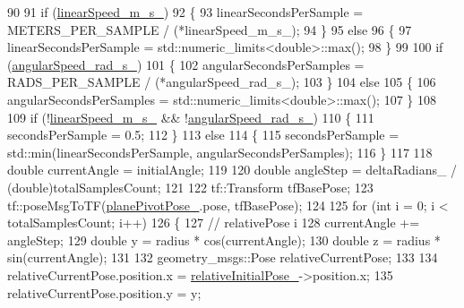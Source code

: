 \begin{DoxyCode}
90 
91             \textcolor{keywordflow}{if} (\hyperlink{classcl__move__group__interface_1_1CbCircularPivotMotion_adf6f6bc7a7a55f5c3dff80475e33c2e3}{linearSpeed\_m\_s\_})
92             \{
93                 linearSecondsPerSample = METERS\_PER\_SAMPLE / (*linearSpeed\_m\_s\_);
94             \}
95             \textcolor{keywordflow}{else}
96             \{
97                 linearSecondsPerSample = std::numeric\_limits<double>::max();
98             \}
99 
100             \textcolor{keywordflow}{if} (\hyperlink{classcl__move__group__interface_1_1CbCircularPivotMotion_a39fa383804d82285e07fa1c5a37cc587}{angularSpeed\_rad\_s\_})
101             \{
102                 angularSecondsPerSamples = RADS\_PER\_SAMPLE / (*angularSpeed\_rad\_s\_);
103             \}
104             \textcolor{keywordflow}{else}
105             \{
106                 angularSecondsPerSamples = std::numeric\_limits<double>::max();
107             \}
108 
109             \textcolor{keywordflow}{if} (!\hyperlink{classcl__move__group__interface_1_1CbCircularPivotMotion_adf6f6bc7a7a55f5c3dff80475e33c2e3}{linearSpeed\_m\_s\_} && !\hyperlink{classcl__move__group__interface_1_1CbCircularPivotMotion_a39fa383804d82285e07fa1c5a37cc587}{angularSpeed\_rad\_s\_})
110             \{
111                 secondsPerSample = 0.5;
112             \}
113             \textcolor{keywordflow}{else}
114             \{
115                 secondsPerSample = std::min(linearSecondsPerSample, angularSecondsPerSamples);
116             \}
117 
118             \textcolor{keywordtype}{double} currentAngle = initialAngle;
119 
120             \textcolor{keywordtype}{double} angleStep = deltaRadians\_ / (double)totalSamplesCount;
121 
122             tf::Transform tfBasePose;
123             tf::poseMsgToTF(\hyperlink{classcl__move__group__interface_1_1CbCircularPivotMotion_a0994efbe93b9f9a61fcf3703c360cda2}{planePivotPose\_}.pose, tfBasePose);
124 
125             \textcolor{keywordflow}{for} (\textcolor{keywordtype}{int} i = 0; i < totalSamplesCount; i++)
126             \{
127                 \textcolor{comment}{// relativePose i}
128                 currentAngle += angleStep;
129                 \textcolor{keywordtype}{double} y = radius * cos(currentAngle);
130                 \textcolor{keywordtype}{double} z = radius * sin(currentAngle);
131 
132                 geometry\_msgs::Pose relativeCurrentPose;
133 
134                 relativeCurrentPose.position.x = \hyperlink{classcl__move__group__interface_1_1CbCircularPivotMotion_a1b2cc65d2f27a4dec54c20f1f00d4bb8}{relativeInitialPose\_}->position.x;
135                 relativeCurrentPose.position.y = y;

\end{DoxyCode}

